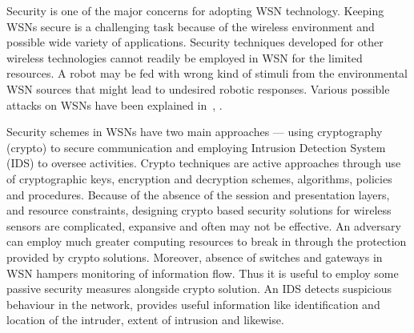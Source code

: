 \documentclass[conference,manuscript]{IEEEtran}
\begin{document}
Security is one of the major concerns for adopting WSN technology. 
Keeping WSNs secure is a challenging task because of the wireless environment and possible  wide variety of applications.
Security techniques developed for other wireless technologies cannot readily be employed in WSN for the limited resources.
A robot may be fed with wrong kind of stimuli from the environmental WSN sources that might  lead to undesired robotic responses. 
Various possible attacks on WSNs have been explained in~\cite{roosta2006taxonomy}, \cite{roosta2008attacks}.



Security schemes in WSNs have two main approaches --- using cryptography (crypto) to secure communication and  employing Intrusion Detection System (IDS) to oversee activities.
Crypto techniques are active approaches through use of cryptographic keys, encryption and decryption schemes, algorithms, policies and procedures.
Because  of the absence of the session and presentation layers, and resource constraints, designing crypto based security solutions for wireless sensors are complicated, expansive and often may not be effective.
An adversary can employ much greater computing resources to break in through the protection provided by crypto solutions.
Moreover, absence of switches and gateways in WSN hampers monitoring of information flow.
Thus it is useful to employ some passive security measures alongside crypto solution.
An IDS detects suspicious behaviour in the network, provides useful information like identification and location of the intruder, extent of intrusion and likewise.
\end{document}

